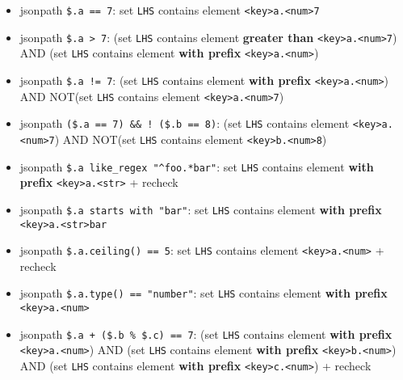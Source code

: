 \documentclass[
]{article}
\providecommand{\tightlist}{%
  \setlength{\itemsep}{0pt}\setlength{\parskip}{0pt}}
\begin{document}
\begin{itemize}
  \begin{itemize}
  \tightlist
  \item
    jsonpath \texttt{\$.a\ ==\ 7}: set \texttt{LHS} contains element
    \texttt{\textless{}key\textgreater{}a.\textless{}num\textgreater{}7}
  \item
    jsonpath \texttt{\$.a\ \textgreater{}\ 7}: (set \texttt{LHS}
    contains element \textbf{greater than}
    \texttt{\textless{}key\textgreater{}a.\textless{}num\textgreater{}7})
    AND (set \texttt{LHS} contains element \textbf{with prefix}
    \texttt{\textless{}key\textgreater{}a.\textless{}num\textgreater{}})
  \item
    jsonpath \texttt{\$.a\ !=\ 7}: (set \texttt{LHS} contains element
    \textbf{with prefix}
    \texttt{\textless{}key\textgreater{}a.\textless{}num\textgreater{}})
    AND NOT(set \texttt{LHS} contains element
    \texttt{\textless{}key\textgreater{}a.\textless{}num\textgreater{}7})
  \item
    jsonpath \texttt{(\$.a\ ==\ 7)\ \&\&\ !\ (\$.b\ ==\ 8)}: (set
    \texttt{LHS} contains element
    \texttt{\textless{}key\textgreater{}a.\textless{}num\textgreater{}7})
    AND NOT(set \texttt{LHS} contains element
    \texttt{\textless{}key\textgreater{}b.\textless{}num\textgreater{}8})
  \item
    jsonpath \texttt{\$.a\ like\_regex\ "\^{}foo.*bar"}: set
    \texttt{LHS} contains element \textbf{with prefix}
    \texttt{\textless{}key\textgreater{}a.\textless{}str\textgreater{}}
    + recheck
  \item
    jsonpath \texttt{\$.a\ starts\ with\ "bar"}: set \texttt{LHS}
    contains element \textbf{with prefix}
    \texttt{\textless{}key\textgreater{}a.\textless{}str\textgreater{}bar}
  \item
    jsonpath \texttt{\$.a.ceiling()\ ==\ 5}: set \texttt{LHS} contains
    element
    \texttt{\textless{}key\textgreater{}a.\textless{}num\textgreater{}}
    + recheck
  \item
    jsonpath \texttt{\$.a.type()\ ==\ "number"}: set \texttt{LHS}
    contains element \textbf{with prefix}
    \texttt{\textless{}key\textgreater{}a.\textless{}num\textgreater{}}
  \item
    jsonpath \texttt{\$.a\ +\ (\$.b\ \%\ \$.c)\ ==\ 7}: (set
    \texttt{LHS} contains element \textbf{with prefix}
    \texttt{\textless{}key\textgreater{}a.\textless{}num\textgreater{}})
    AND (set \texttt{LHS} contains element \textbf{with prefix}
    \texttt{\textless{}key\textgreater{}b.\textless{}num\textgreater{}})
    AND (set \texttt{LHS} contains element \textbf{with prefix}
    \texttt{\textless{}key\textgreater{}c.\textless{}num\textgreater{}})
    + recheck
  \end{itemize}
\end{itemize}
\end{document}
